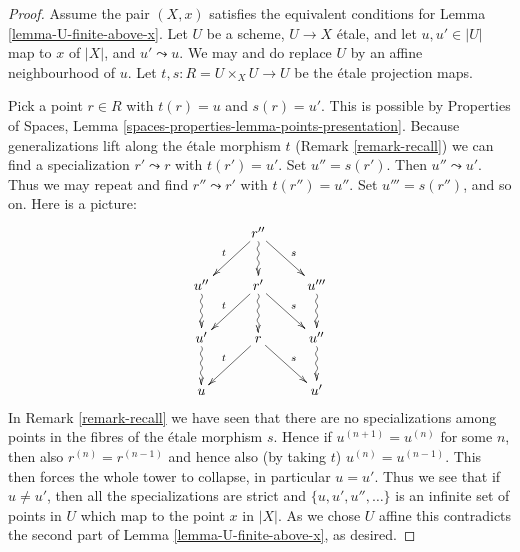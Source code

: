 \documentclass{stacks-project}
\theoremstyle{plain}
\theoremstyle{definition}
\theoremstyle{remark}
\numberwithin{equation}{subsection}
\begin{document}
\begin{proof}
Assume the pair $(X, x)$ satisfies the
equivalent conditions for Lemma \ref{lemma-U-finite-above-x}.
Let $U$ be a scheme, $U \to X$ \'etale, and
let $u, u' \in |U|$ map to $x$ of $|X|$, and
$u' \leadsto u$. We may and do replace $U$ by an affine
neighbourhood of $u$. Let $t, s : R = U \times_X U \to U$
be the \'etale projection maps.

\medskip\noindent
Pick a point $r \in R$ with $t(r) = u$ and $s(r) = u'$.
This is possible by
Properties of Spaces,
Lemma \ref{spaces-properties-lemma-points-presentation}.
Because generalizations lift along the \'etale morphism $t$
(Remark \ref{remark-recall}) we can find a specialization $r' \leadsto r$ with
$t(r') = u'$. Set $u'' = s(r')$. Then $u'' \leadsto u'$.
Thus we may repeat and find $r'' \leadsto r'$ with
$t(r'') = u''$. Set $u''' = s(r'')$, and so on.
Here is a picture:
$$
\xymatrix{
& r'' \ar[rd]^s \ar[ld]_t \ar@{~>}[d] & \\
u'' \ar@{~>}[d] & r' \ar[rd]^s \ar[ld]_t \ar@{~>}[d] & u''' \ar@{~>}[d] \\
u' \ar@{~>}[d] & r \ar[rd]^s \ar[ld]_t & u'' \ar@{~>}[d] \\
u & & u'
}
$$
In Remark \ref{remark-recall} we have seen that there are no specializations
among points in the fibres of the \'etale morphism $s$. Hence if
$u^{(n + 1)} = u^{(n)}$ for some $n$, then also $r^{(n)} = r^{(n - 1)}$ and
hence also (by taking $t$) $u^{(n)} = u^{(n - 1)}$. This then forces the
whole tower to collapse, in particular $u = u'$. Thus we see that if
$u \not = u'$, then all the specializations are strict and
$\{u, u', u'', \ldots\}$ is an infinite set of points in $U$ which map to the
point $x$ in $|X|$. As we chose $U$ affine this contradicts the second part of
Lemma \ref{lemma-U-finite-above-x}, as desired.
\end{proof}
\end{document}
